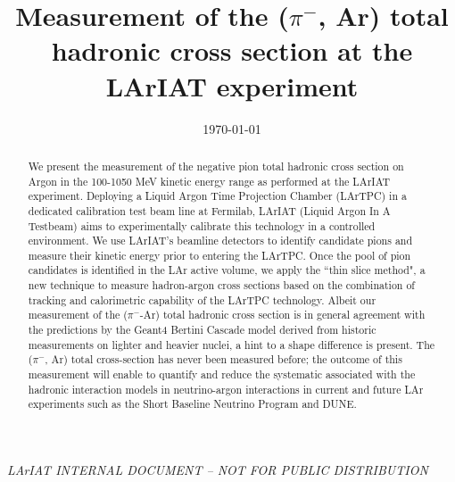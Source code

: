 \documentclass[aps,prl,twocolumn,showpacs,superscriptaddress,groupedaddress]{revtex4}  %
\begin{document}
\widetext
{}
\centerline{\em LArIAT INTERNAL DOCUMENT -- NOT FOR PUBLIC DISTRIBUTION}


\title{Measurement of the ($\pi^-$, Ar) total hadronic cross section at the LArIAT experiment}
\date{\today}


\begin{abstract}
We present the measurement of the negative pion total hadronic cross section on Argon in the 100-1050 MeV kinetic energy range as performed at the LArIAT experiment.   Deploying a Liquid Argon Time Projection Chamber (LArTPC) in a dedicated calibration test beam line at Fermilab, LArIAT (Liquid Argon In A Testbeam) aims to experimentally calibrate this technology in a controlled environment. We use LArIAT's beamline detectors to identify candidate pions and measure their kinetic energy prior to entering the LArTPC. Once the pool of pion candidates is identified in the LAr active volume, we apply the ``thin slice method", a new technique to measure hadron-argon cross sections based on the combination of tracking and calorimetric capability of the LArTPC technology. 
Albeit our measurement of the  ($\pi^-$-Ar) total hadronic cross section is in general agreement with the predictions by the Geant4 Bertini Cascade model derived from historic measurements on lighter and heavier nuclei, a hint to a shape difference is present.
The ($\pi^-$, Ar) total cross-section has never been measured before; the outcome of this measurement will enable to quantify and reduce the systematic associated with the hadronic interaction models in neutrino-argon interactions in current and future LAr experiments such as the Short Baseline Neutrino Program and DUNE.
 



\end{abstract}
\end{document}
